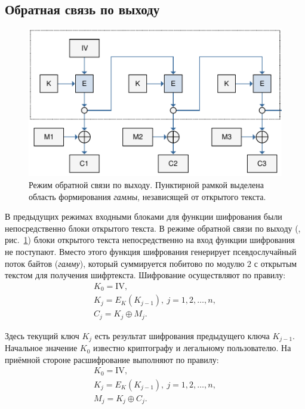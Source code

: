 \subsection{Обратная связь по выходу}

\begin{figure}[bt]
	\centering
	\includegraphics[width=1\textwidth]{pic/OFB}
	\caption{Режим обратной связи по выходу. Пунктирной рамкой выделена область формирования \emph{гаммы}, независящей от открытого текста.}
	\label{fig:OFB}
\end{figure}

В предыдущих режимах входными блоками для функции шифрования были непосредственно блоки открытого текста. В режиме обратной связи по выходу (, рис.~\ref{fig:OFB}) блоки открытого текста непосредственно на вход функции шифрования не поступают. Вместо этого функция шифрования генерирует псевдослучайный поток байтов (\emph{гамму}), который суммируется побитово по модулю $2$ с открытым текстом для получения шифртекста. Шифрование осуществляют по правилу:
\[ \begin{array}{l}
    K_0 = \textrm{IV}, \\
    K_j = E_K(K_{j-1}), ~ j = 1, 2, \dots, n, \\
    C_j = K_j \oplus M_j.
\end{array} \]

Здесь текущий ключ $K_j$ есть результат шифрования предыдущего ключа $K_{j-1}$. Начальное значение $K_0$ известно криптографу и легальному пользователю. На приёмной стороне расшифрование выполняют по правилу:
\[ \begin{array}{l}
    K_0 = \textrm{IV}, \\
    K_j = E_K(K_{j-1}), ~ j = 1, 2, \dots, n, \\
    M_j = K_j \oplus C_j.
\end{array} \]

